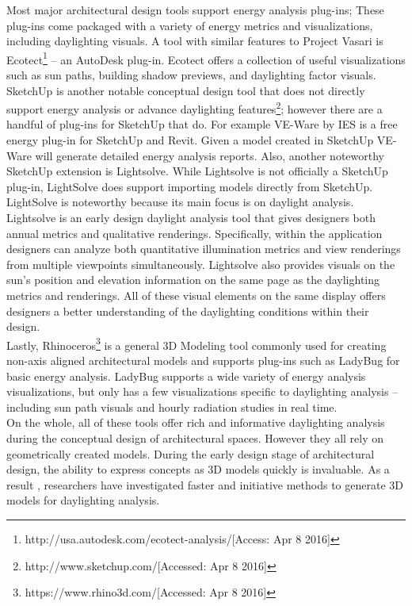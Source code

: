 	Most major architectural design tools support energy analysis plug-ins; These plug-ins come packaged with a variety of energy metrics and visualizations, including daylighting visuals.
	A tool with similar features to Project Vasari is Ecotect\footnote{http://usa.autodesk.com/ecotect-analysis/[Access: Apr 8 2016]} -- an AutoDesk plug-in.
	Ecotect offers a collection of useful visualizations such as sun paths, building shadow previews, and daylighting factor visuals. \\

	SketchUp is another notable conceptual design tool that does not directly support energy analysis or advance daylighting features\footnote{http://www.sketchup.com/[Accessed: Apr 8 2016]}; however there are a handful of plug-ins for SketchUp that do.
	For example VE-Ware by IES is a free energy plug-in for SketchUp and Revit. 
	Given a model created in SketchUp VE-Ware will generate detailed energy analysis reports.
	Also, another noteworthy SketchUp extension is Lightsolve\cite{andersen2008intuitive}.
	While Lightsolve is not officially a SketchUp plug-in, LightSolve does support importing models directly from SketchUp.
	LightSolve is noteworthy because its main focus is on daylight analysis.
	Lightsolve is an early design daylight analysis tool that gives designers both annual metrics and qualitative renderings.
	Specifically, within the application designers can analyze both quantitative illumination metrics and view renderings from multiple viewpoints simultaneously.
	Lightsolve also provides visuals on the sun's position and elevation information on the same page as the daylighting metrics and renderings. 
	All of these visual elements on the same display offers designers a better understanding of the daylighting conditions within their design\cite{andersen2011informing}. \\

	Lastly, Rhinoceros\footnote{https://www.rhino3d.com/[Accessed: Apr 8 2016]} is a general 3D Modeling tool commonly used for creating non-axis aligned architectural models and supports plug-ins such as LadyBug for basic energy analysis\cite{ladybug}.
	LadyBug supports a wide variety of energy analysis visualizations, but only has a few visualizations specific to daylighting analysis -- including sun path visuals and hourly radiation studies in real time. \\

	On the whole, all of these tools offer rich and informative daylighting analysis during the conceptual  design of architectural spaces.
	However they all rely on geometrically created models.
	During the early design stage of architectural design, the ability to express concepts as 3D models quickly is invaluable.
	As a result , researchers have investigated faster and initiative methods to generate 3D models for daylighting analysis.
	
